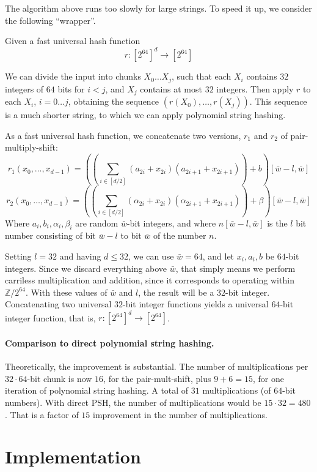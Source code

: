 \documentclass[]{article}
\begin{document}
The algorithm above runs too slowly for large strings. To speed it up, we consider the following ``wrapper''.

Given a fast universal hash function
\[r : [2^{64}]^d \to [2^{64}] \]

We can divide the input into chunks $X_0 \ldots X_j$, such that each $X_i$ contains $32$ integers of $64$ bits for $i<j$, and $X_j$ contains at most $32$ integers. Then apply $r$ to each $X_i$, $i=0\ldots j$, obtaining the sequence $\left(r(X_0), \ldots , r(X_j)\right)$. This sequence is a much shorter string, to which we can apply polynomial string hashing.

As a fast universal hash function, we concatenate two versions, $r_1$ and $r_2$ of pair-multiply-shift:
\[r_1(x_0,\ldots ,x_{d-1}) = \left(\left(\sum_{i\in [d/2]}(a_{2i} + x_{2i})(a_{2i+1} + x_{2i+1}) \right)+b \right) [\bar{w}-l,\bar{w}]\]
\[r_2(x_0,\ldots ,x_{d-1}) = \left(\left(\sum_{i\in [d/2]}(\alpha_{2i} + x_{2i})(\alpha_{2i+1} + x_{2i+1}) \right)+\beta \right) [\bar{w}-l,\bar{w}]\]
Where $a_i,b_i,\alpha_i,\beta_i$ are random $\bar{w}$-bit integers, and where $n[\bar{w}-l,\bar{w}]$ is the $l$ bit number consisting of bit $\bar{w}-l$ to bit $\bar{w}$ of the number $n$.

Setting $l = 32$ and having $d\leq 32$, we can use $\bar{w} = 64$, and let $x_i,a_i,b$ be $64$-bit integers. Since we discard everything above $\bar{w}$, that simply means we perform carriless multiplication and addition, since it corresponds to operating within $\mathbb{Z}/2^{64}$. With these values of $\bar{w}$ and $l$, the result will be a $32$-bit integer. Concatenating two universal $32$-bit integer functions yields a universal $64$-bit integer function, that is, $r: [2^{64}]^d \to [2^{64}]$.

\paragraph{Comparison to direct polynomial string hashing.} Theoretically, the improvement is substantial. The number of multiplications per $32\cdot 64$-bit chunk is now $16$, for the pair-mult-shift, plus $9+6=15$, for one iteration of polynomial string hashing. A total of $31$ multiplications (of $64$-bit numbers). With direct PSH, the number of multiplications would be $15\cdot 32 = 480$. That is a factor of $15$ improvement in the number of multiplications.

\section{Implementation}
\end{document}
